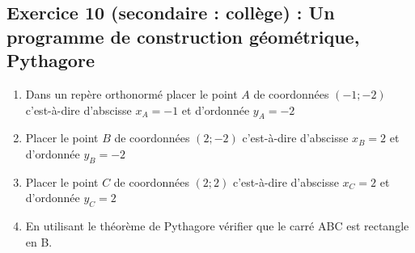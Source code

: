 \subsection{Exercice 10 (secondaire : collège) : Un programme de construction géométrique, Pythagore}

\label{geom:niveau10}

\begin{enumerate}[label=G\arabic*)]
	\item Dans un repère orthonormé placer le point \(A\) de coordonnées \((-1 ; -2)\) c'est-à-dire d'abscisse \(x_A = -1\) et d'ordonnée \(y_A = -2\)
	\item Placer le point \(B\) de coordonnées \((2 ; -2)\) c'est-à-dire d'abscisse \(x_B = 2\) et d'ordonnée \(y_B = -2\)
	\item Placer le point \(C\) de coordonnées \((2 ; 2)\) c'est-à-dire d'abscisse \(x_C = 2\) et d'ordonnée \(y_C = 2\)
	\item En utilisant le théorème de Pythagore vérifier que le carré ABC est rectangle en B.
\end{enumerate}
